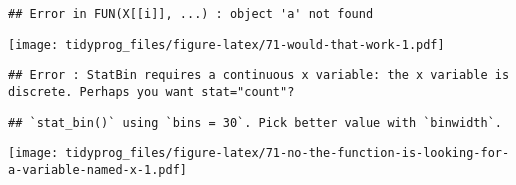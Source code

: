 \documentclass[]{book}
\newenvironment{Shaded}{\begin{snugshade}}{\end{snugshade}}
\newcommand{\CommentTok}[1]{\textcolor[rgb]{0.56,0.35,0.01}{\textit{#1}}}
\newcommand{\ControlFlowTok}[1]{\textcolor[rgb]{0.13,0.29,0.53}{\textbf{#1}}}
\newcommand{\DataTypeTok}[1]{\textcolor[rgb]{0.13,0.29,0.53}{#1}}
\newcommand{\DecValTok}[1]{\textcolor[rgb]{0.00,0.00,0.81}{#1}}
\newcommand{\KeywordTok}[1]{\textcolor[rgb]{0.13,0.29,0.53}{\textbf{#1}}}
\newcommand{\NormalTok}[1]{#1}
\newcommand{\OperatorTok}[1]{\textcolor[rgb]{0.81,0.36,0.00}{\textbf{#1}}}
\newcommand{\StringTok}[1]{\textcolor[rgb]{0.31,0.60,0.02}{#1}}
\begin{document}
\begin{verbatim}
## Error in FUN(X[[i]], ...) : object 'a' not found
\end{verbatim}

\begin{Shaded}
\end{Shaded}

\texttt{[image: tidyprog\_files/figure-latex/71-would-that-work-1.pdf]}

\begin{verbatim}
## Error : StatBin requires a continuous x variable: the x variable is discrete. Perhaps you want stat="count"?
\end{verbatim}

\begin{Shaded}
\end{Shaded}

\begin{verbatim}
## `stat_bin()` using `bins = 30`. Pick better value with `binwidth`.
\end{verbatim}

\texttt{[image: tidyprog\_files/figure-latex/71-no-the-function-is-looking-for-a-variable-named-x-1.pdf]}

\begin{Shaded}
\end{Shaded}
\end{document}
